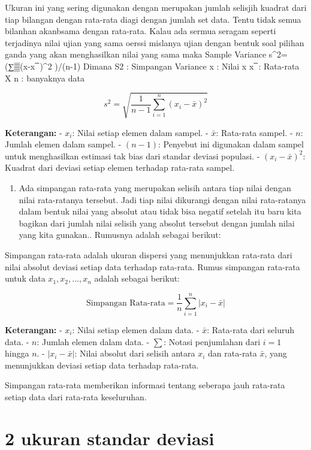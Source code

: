 \documentclass[
]{book}
\providecommand{\tightlist}{%
  \setlength{\itemsep}{0pt}\setlength{\parskip}{0pt}}
\theoremstyle{definition}
\theoremstyle{definition}
\theoremstyle{definition}
\theoremstyle{definition}
\theoremstyle{remark}
\begin{document}
Ukuran ini yang sering digunakan dengan merupakan jumlah selisjih kuadrat dari tiap bilangan dengan rata-rata diagi dengan jumlah set data. Tentu tidak semua bilanhan akanbsama dengan rata-rata. Kalau ada sermua seragam seperti terjadinya nilai ujian yang sama oerssi mislanya ujian dengan bentuk soal pilihan ganda yang akan menghasilkan nilai yang sama maka
Sample Variance
s\^{}2=(∑▒(x-x ̅ )\^{}2 )/(n-1)
Dimana
S2 : Simpangan Variance
x : Nilai x
x ̅ : Rata-rata X
n : banyaknya data

\[
s^2 = \sqrt{\frac{1}{n - 1} \sum_{i=1}^{n} (x_i - \bar{x})^2}
\]

\textbf{Keterangan:}
- \(x_i\): Nilai setiap elemen dalam sampel.
- \(\bar{x}\): Rata-rata sampel.
- \(n\): Jumlah elemen dalam sampel.
- \((n - 1)\): Penyebut ini digunakan dalam sampel untuk menghasilkan estimasi tak bias dari standar deviasi populasi.
- \((x_i - \bar{x})^2\): Kuadrat dari deviasi setiap elemen terhadap rata-rata sampel.

\begin{enumerate}
\def\labelenumi{\arabic{enumi}.}
\setcounter{enumi}{1}
\tightlist
\item
  Ada simpangan rata-rata yang merupakan selisih antara tiap nilai dengan nilai rata-ratanya tersebut. Jadi tiap nilai dikurangi dengan nilai rata-ratanya dalam bentuk nilai yang absolut atau tidak bisa negatif setelah itu baru kita bagikan dari jumlah nilai selisih yang absolut tersebut dengan jumlah nilai yang kita gunakan.. Rumusnya adalah sebagai berikut:
\end{enumerate}

Simpangan rata-rata adalah ukuran dispersi yang menunjukkan rata-rata dari nilai absolut deviasi setiap data terhadap rata-rata. Rumus simpangan rata-rata untuk data \(x_1, x_2, \dots, x_n\) adalah sebagai berikut:

\[
\text{Simpangan Rata-rata} = \frac{1}{n} \sum_{i=1}^{n} |x_i - \bar{x}|
\]

\textbf{Keterangan:}
- \(x_i\): Nilai setiap elemen dalam data.
- \(\bar{x}\): Rata-rata dari seluruh data.
- \(n\): Jumlah elemen dalam data.
- \(\sum\): Notasi penjumlahan dari \(i = 1\) hingga \(n\).
- \(|x_i - \bar{x}|\): Nilai absolut dari selisih antara \(x_i\) dan rata-rata \(\bar{x}\), yang menunjukkan deviasi setiap data terhadap rata-rata.

Simpangan rata-rata memberikan informasi tentang seberapa jauh rata-rata setiap data dari rata-rata keseluruhan.

\hypertarget{ukuran-standar-deviasi}{%
\section*{2 ukuran standar deviasi}\label{ukuran-standar-deviasi}}
\end{document}

